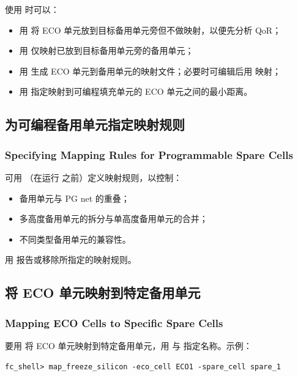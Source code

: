 使用  时可以：
\begin{itemize}
  \item 用  将 ECO 单元放到目标备用单元旁但不做映射，以便先分析 QoR；
  \item 用  仅映射已放到目标备用单元旁的备用单元；
  \item 用  生成 ECO 单元到备用单元的映射文件；必要时可编辑后用  映射；
  \item 用  指定映射到可编程填充单元的 ECO 单元之间的最小距离。
\end{itemize}

\subsection{为可编程备用单元指定映射规则}
\subsubsection*{Specifying Mapping Rules for Programmable Spare Cells}

可用 （在运行  之前）定义映射规则，以控制：
\begin{itemize}
  \item 备用单元与 PG net 的重叠；
  \item 多高度备用单元的拆分与单高度备用单元的合并；
  \item 不同类型备用单元的兼容性。
\end{itemize}
用  报告或移除所指定的映射规则。

\subsection{将 ECO 单元映射到特定备用单元}
\subsubsection*{Mapping ECO Cells to Specific Spare Cells}

要用  将 ECO 单元映射到特定备用单元，用  与  指定名称。示例：
\begin{lstlisting}
fc_shell> map_freeze_silicon -eco_cell ECO1 -spare_cell spare_1
\end{lstlisting}


